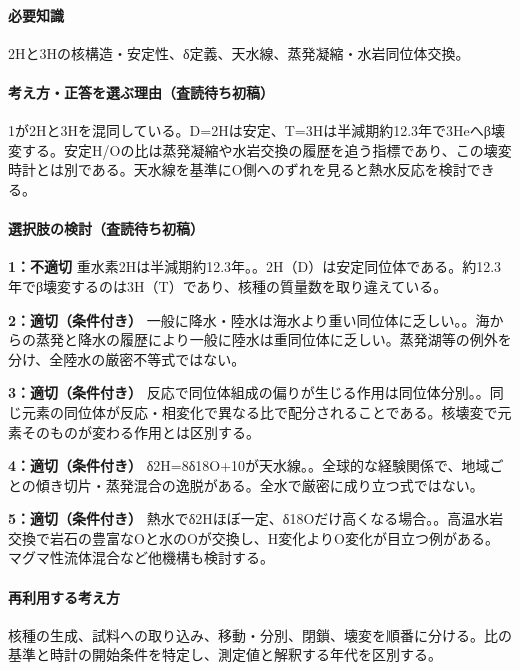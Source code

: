 \paragraph{必要知識} 2Hと3Hの核構造・安定性、δ定義、天水線、蒸発凝縮・水岩同位体交換。

\paragraph{考え方・正答を選ぶ理由（査読待ち初稿）} 1が2Hと3Hを混同している。D=\allowbreak{}2Hは安定、T=\allowbreak{}3Hは半減期約12.3年で3Heへβ壊変する。安定H/Oの比は蒸発凝縮や水岩交換の履歴を追う指標であり、この壊変時計とは別である。天水線を基準にO側へのずれを見ると熱水反応を検討できる。

\paragraph{選択肢の検討（査読待ち初稿）}\mbox{}\par

\noindent\textbf{1：不適切} 重水素2Hは半減期約12.3年。。2H（D）は安定同位体である。約12.3年でβ壊変するのは3H（T）であり、核種の質量数を取り違えている。\par

\noindent\textbf{2：適切（条件付き）} 一般に降水・陸水は海水より重い同位体に乏しい。。海からの蒸発と降水の履歴により一般に陸水は重同位体に乏しい。蒸発湖等の例外を分け、全陸水の厳密不等式ではない。\par

\noindent\textbf{3：適切（条件付き）} 反応で同位体組成の偏りが生じる作用は同位体分別。。同じ元素の同位体が反応・相変化で異なる比で配分されることである。核壊変で元素そのものが変わる作用とは区別する。\par

\noindent\textbf{4：適切（条件付き）} δ2H=\allowbreak{}8δ18O+10が天水線。。全球的な経験関係で、地域ごとの傾き切片・蒸発混合の逸脱がある。全水で厳密に成り立つ式ではない。\par

\noindent\textbf{5：適切（条件付き）} 熱水でδ2Hほぼ一定、δ18Oだけ高くなる場合。。高温水岩交換で岩石の豊富なOと水のOが交換し、H変化よりO変化が目立つ例がある。マグマ性流体混合など他機構も検討する。\par

\paragraph{再利用する考え方} 核種の生成、試料への取り込み、移動・分別、閉鎖、壊変を順番に分ける。比の基準と時計の開始条件を特定し、測定値と解釈する年代を区別する。

